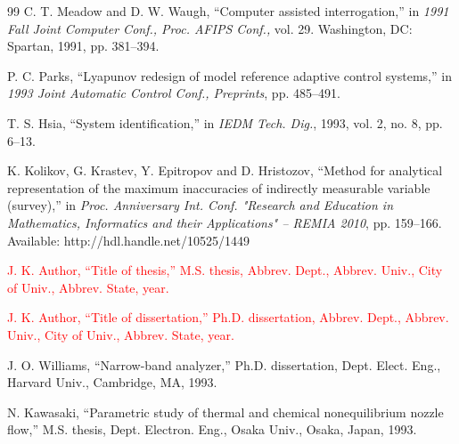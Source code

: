 \documentclass[11pt,a5paper,twoside]{article}
\begin{document}
\begin{thebibliography}{99}
  C. T. Meadow and D. W. Waugh, ``Computer assisted interrogation,'' in \textit{1991 Fall Joint Computer Conf., Proc. AFIPS Conf.,} vol. 29. Washington, DC: Spartan, 1991, pp. 381--394. 

  P. C. Parks, ``Lyapunov redesign of model reference adaptive control systems,'' in \textit{1993 Joint Automatic Control Conf., Preprints}, pp. 485--491. 

  T. S. Hsia, ``System identification,'' in \textit{IEDM Tech. Dig.}, 1993, vol. 2, no. 8, pp. 6--13. 


 K. Kolikov, G. Krastev, Y. Epitropov and D. Hristozov, ``Method for analytical representation of the maximum inaccuracies of indirectly 
measurable variable (survey),'' in \textit{Proc. Anniversary Int. Conf. "Research and Education in Mathematics, Informatics and their Applications" -- REMIA 2010}, pp. 159--166. Available: http://hdl.handle.net/10525/1449



  \textcolor{red}{
J. K. Author, ``Title of thesis,'' M.S. thesis, Abbrev. Dept., Abbrev. Univ., City of Univ., Abbrev. State, year. }

 \textcolor{red}{ 
J. K. Author, ``Title of dissertation,'' Ph.D. dissertation, Abbrev. 
Dept., Abbrev. Univ., City of Univ., Abbrev. State, year.}


  J. O. Williams, ``Narrow-band analyzer,'' Ph.D. dissertation, Dept. 
Elect. Eng., Harvard Univ., Cambridge, MA, 1993. 

  N. Kawasaki, ``Parametric study of thermal and chemical nonequilibrium nozzle flow,'' M.S. thesis, Dept. Electron. Eng., Osaka Univ., Osaka, Japan, 1993. 


\end{thebibliography}
\end{document}
